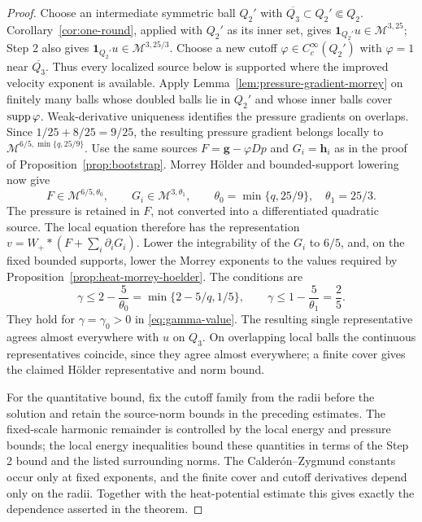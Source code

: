 \documentclass[11pt,reqno]{amsart}
\begin{document}
\begin{proof}
Choose an intermediate symmetric ball $Q_2'$ with
$\overline{Q_3}\subset Q_2'\Subset Q_2$.
Corollary~\ref{cor:one-round}, applied with $Q_2'$ as its inner set,
gives $\mathbf1_{Q_2'}u\in\mathcal M^{3,25}$; Step 2 also gives
$\mathbf1_{Q_2'}u\in\mathcal M^{3,25/3}$.
Choose a new cutoff $\varphi\in C_c^\infty(Q_2')$ with
$\varphi=1$ near $\overline{Q_3}$. Thus every localized source below is supported where
the improved velocity exponent is available.
Apply Lemma~\ref{lem:pressure-gradient-morrey} on finitely many balls
whose doubled balls lie in $Q_2'$ and whose inner balls cover
$\operatorname{supp}\varphi$.
Weak-derivative uniqueness identifies the pressure gradients on overlaps.
Since $1/25+8/25=9/25$, the resulting pressure gradient belongs locally to
$\mathcal M^{6/5,\min\{q,25/9\}}$.
Use the same sources $F=\mathbf g-\varphi Dp$ and $G_i=\mathbf h_i$
as in the proof of Proposition~\ref{prop:bootstrap}. Morrey H\"older
and bounded-support lowering now give
\[
 F\in\mathcal M^{6/5,\theta_0},\qquad
 G_i\in\mathcal M^{3,\theta_1},\qquad
 \theta_0=\min\{q,25/9\},\quad \theta_1=25/3.
\]
The pressure is retained in $F$, not converted into a differentiated
quadratic source. The local equation therefore has the representation
$v=W_+*(F+\sum_i\partial_iG_i)$.
Lower the integrability of the $G_i$ to $6/5$, and, on the fixed bounded
supports, lower the Morrey exponents to the values required by
Proposition~\ref{prop:heat-morrey-hoelder}. The conditions are
\[
 \gamma\le 2-\frac5{\theta_0}
       =\min\{2-5/q,1/5\},\qquad
 \gamma\le 1-\frac5{\theta_1}=\frac25 .
\]
They hold for $\gamma=\gamma_0>0$ in \eqref{eq:gamma-value}.
The resulting single representative agrees almost everywhere with $u$
on $Q_3$. On overlapping local balls the continuous representatives
coincide, since they agree almost everywhere; a finite cover gives the
claimed H\"older representative and norm bound.

For the quantitative bound, fix the cutoff family from the radii before
the solution and retain the source-norm bounds in the preceding estimates.
The fixed-scale harmonic remainder is controlled by the local energy and
pressure bounds; the local energy inequalities bound these quantities
in terms of the Step 2 bound and the listed surrounding norms.
The Calder\'on--Zygmund constants occur only at fixed exponents, and the
finite cover and cutoff derivatives depend only on the radii.
Together with the heat-potential estimate this gives exactly the dependence
asserted in the theorem.
\end{proof}
\end{document}
